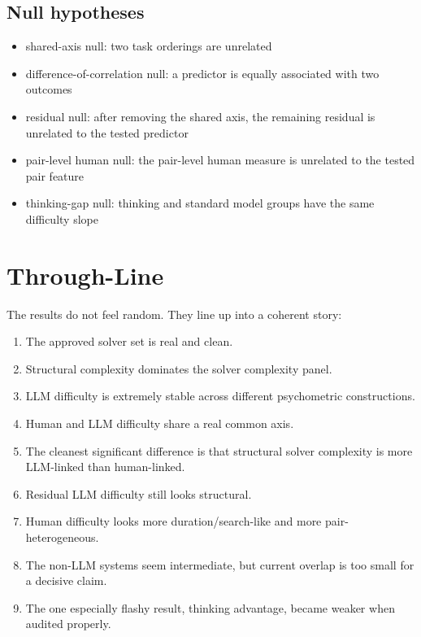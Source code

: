 \documentclass[11pt]{article}
\begin{document}
\subsection*{Null hypotheses}

\begin{itemize}
  \item shared-axis null: two task orderings are unrelated
  \item difference-of-correlation null: a predictor is equally associated with two outcomes
  \item residual null: after removing the shared axis, the remaining residual is unrelated to the tested predictor
  \item pair-level human null: the pair-level human measure is unrelated to the tested pair feature
  \item thinking-gap null: thinking and standard model groups have the same difficulty slope
\end{itemize}

\section*{Through-Line}

The results do not feel random. They line up into a coherent story:

\begin{enumerate}
  \item The approved solver set is real and clean.
  \item Structural complexity dominates the solver complexity panel.
  \item LLM difficulty is extremely stable across different psychometric constructions.
  \item Human and LLM difficulty share a real common axis.
  \item The cleanest significant difference is that structural solver complexity is more LLM-linked than human-linked.
  \item Residual LLM difficulty still looks structural.
  \item Human difficulty looks more duration/search-like and more pair-heterogeneous.
  \item The non-LLM systems seem intermediate, but current overlap is too small for a decisive claim.
  \item The one especially flashy result, thinking advantage, became weaker when audited properly.
\end{enumerate}
\end{document}
